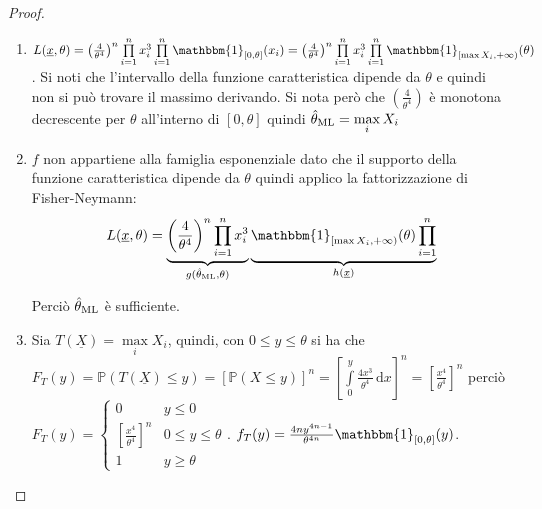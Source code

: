 \documentclass[hidelinks, 10pt]{report}
\begin{document}
\begin{proof}
\noindent
\begin{enumerate}
\item $ L(\underline{x}, \theta) = \left( \frac{4}{\theta^{4}} \right)^{n} \prod\limits_{i = 1}^{n} x_{i}^{3} \prod\limits_{i = 1}^{n} \mathbbm{1}_{[0, \theta]} (x_{i}) = \left( \frac{4}{\theta^{4}} \right)^{n} \prod\limits_{i = 1}^{n} x_{i}^{3} \prod\limits_{i = 1}^{n} \mathbbm{1}_{[\max X_{i}, +\infty)} (\theta) $. Si noti che l'intervallo della funzione caratteristica dipende da $ \theta $ e quindi non si pu\`o trovare il massimo derivando. Si nota per\`o che $ \left( \frac{4}{\theta^{4}} \right) $ \`e monotona decrescente per $ \theta $ all'interno di $ [0, \theta] $ quindi $ \hat{\theta}_{\text{ML}} = \max\limits_{i} X_{i} $
\item $ f $ non appartiene alla famiglia esponenziale dato che il supporto della funzione caratteristica dipende da $ \theta $ quindi applico la fattorizzazione di Fisher-Neymann: 
\[ L(\underline{x}, \theta) = \underbrace{\left( \frac{4}{\theta^{4}} \right)^{n} \prod\limits_{i = 1}^{n} x_{i}^{3}}_{g(\ML{\theta}, \theta)} \underbrace{\mathbbm{1}_{[\max X_{i}, +\infty)} (\theta) \prod\limits_{i = 1}^{n}}_{h(\underline{x})} \]

Perci\`o $ \hat{\theta}_{\text{ML}} $ \`e sufficiente.
\item Sia $ T(\underline{X}) = \max\limits_{i} X_{i} $, quindi, con $ 0 \le y \le \theta $ si ha che $ F_{T} (y) = \mathbb{P} (T(\underline{X}) \le y) = [\mathbb{P}(X \le y)]^{n} = \left[ \int\limits_{0}^{y} \frac{4 x^{3}}{\theta^{4}} \, \mathrm{d}x \right]^{n} = \left[ \frac{x^{4}}{\theta^{4}} \right]^{n} $ perci\`o $ F_{T} (y) = \begin{cases} 0 & y \le 0 \\ \left[ \frac{x^{4}}{\theta^{4}} \right]^{n} & 0 \le y \le \theta \\ 1 & y \ge \theta \end{cases} $. $ f_{T} (y) = \frac{4 n y^{4n - 1}}{\theta^{4n}} \mathbbm{1}_{[0, \theta]} (y) $.


\end{enumerate}
\end{proof}
\end{document}
